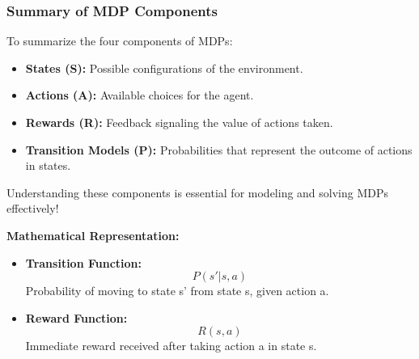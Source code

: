 \documentclass[aspectratio=169]{beamer}
\begin{document}
\begin{frame}[fragile]
    \frametitle{Summary of MDP Components}

    To summarize the four components of MDPs:
    \begin{itemize}
        \item \textbf{States (S):} Possible configurations of the environment.
        \item \textbf{Actions (A):} Available choices for the agent.
        \item \textbf{Rewards (R):} Feedback signaling the value of actions taken.
        \item \textbf{Transition Models (P):} Probabilities that represent the outcome of actions in states.
    \end{itemize}

    Understanding these components is essential for modeling and solving MDPs effectively!
    
    \textbf{Mathematical Representation:}
    \begin{itemize}
        \item \textbf{Transition Function:} 
        \begin{equation}
            P(s'|s,a) 
        \end{equation}
        Probability of moving to state s' from state s, given action a.
        
        \item \textbf{Reward Function:} 
        \begin{equation}
            R(s,a) 
        \end{equation}
        Immediate reward received after taking action a in state s.
    \end{itemize}
\end{frame}
\end{document}
